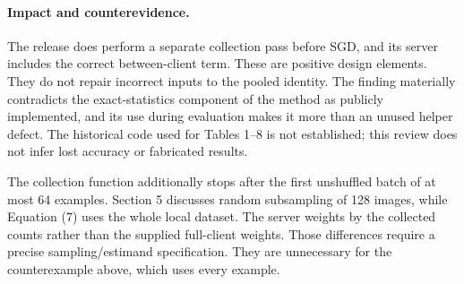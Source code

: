 \documentclass[10pt]{article}
\begin{document}
\paragraph*{Impact and counterevidence.}\mbox{}\par
The release does perform a separate collection pass before SGD, and its server includes the correct between-client term. These are positive design elements. They do not repair incorrect inputs to the pooled identity. The finding materially contradicts the exact-statistics component of the method as publicly implemented, and its use during evaluation makes it more than an unused helper defect. The historical code used for Tables 1–8 is not established; this review does not infer lost accuracy or fabricated results.\par
The collection function additionally stops after the first unshuffled batch of at most 64 examples. Section 5 discusses random subsampling of 128 images, while Equation (7) uses the whole local dataset. The server weights by the collected counts rather than the supplied full-client weights. Those differences require a precise sampling/estimand specification. They are unnecessary for the counterexample above, which uses every example.\par
\end{document}
